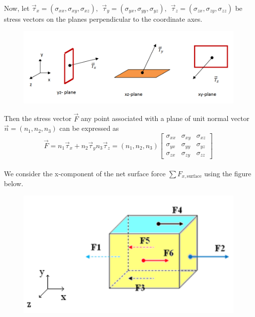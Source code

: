 \documentclass[11pt]{report}
\newcommand{\sps}{\\[0.2cm]}
\newcommand{\dsp}{\displaystyle}
\newcommand{\NI}{\noindent}
\begin{document}
	\NI Now, let $\vec{\tau}_x = (\sigma_{xx}, \sigma_{xy}, \sigma_{xz}),~~ \vec{\tau}_y = (\sigma_{yx}, \sigma_{yy}, \sigma_{yz}),~~ \vec{\tau}_z = (\sigma_{zx}, \sigma_{zy}, \sigma_{zz})$ be stress vectors on the planes perpendicular to the coordinate axes.
	\begin{figure}[!h]
		\centering
		\includegraphics[width=1.02\linewidth]{niyi_img1}
	\end{figure}
	Then the stress vector $\vec{F}$ any point associated with a plane of unit normal vector $\vec{n}=(n_1, n_2, n_3)$ can be expressed as
	\begin{equation}
		\vec{F} = n_1\vec{\tau}_x + n_2\vec{\tau}_y n_3\vec{\tau}_z = (n_1, n_2, n_3) \begin{bmatrix}
			\sigma_{xx} & \sigma_{xy} & \sigma_{xz}\sps
			\sigma_{yx} & \sigma_{yy} & \sigma_{yz}\sps
			\sigma_{zx} & \sigma_{zy} & \sigma_{zz}
		\end{bmatrix} \tag{4}\label{eq:2_t1_4}
	\end{equation}
	{~}\sps
	We consider the x-component of the net surface force $\dsp \sum F_{x,\text{surface}}$ using the figure below.
		\begin{figure}[!h]
		\centering
		\includegraphics[width=0.9\linewidth]{niyi_img2}
	\end{figure}
	
\end{document}
